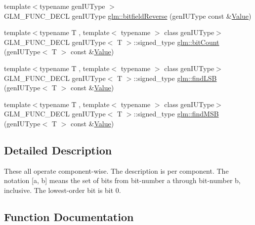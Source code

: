 \begin{DoxyCompactItemize}
\item 
{\footnotesize template$<$typename gen\+I\+U\+Type $>$ }\\G\+L\+M\+\_\+\+F\+U\+N\+C\+\_\+\+D\+E\+CL gen\+I\+U\+Type \hyperlink{group__core__func__integer_gac28880e609c6eeb0a28f1a54b1edc715}{glm\+::bitfield\+Reverse} (gen\+I\+U\+Type const \&\hyperlink{document_8h_a071cf97155ba72ac9a1fc4ad7e63d481}{Value})
\item 
{\footnotesize template$<$typename T , template$<$ typename $>$ class gen\+I\+U\+Type$>$ }\\G\+L\+M\+\_\+\+F\+U\+N\+C\+\_\+\+D\+E\+CL gen\+I\+U\+Type$<$ T $>$\+::signed\+\_\+type \hyperlink{group__core__func__integer_gaf5ecf64cbcb7f806a3c7915dd622209b}{glm\+::bit\+Count} (gen\+I\+U\+Type$<$ T $>$ const \&\hyperlink{document_8h_a071cf97155ba72ac9a1fc4ad7e63d481}{Value})
\item 
{\footnotesize template$<$typename T , template$<$ typename $>$ class gen\+I\+U\+Type$>$ }\\G\+L\+M\+\_\+\+F\+U\+N\+C\+\_\+\+D\+E\+CL gen\+I\+U\+Type$<$ T $>$\+::signed\+\_\+type \hyperlink{group__core__func__integer_ga43d5d9ec05ba4c46035c764ad5fd3135}{glm\+::find\+L\+SB} (gen\+I\+U\+Type$<$ T $>$ const \&\hyperlink{document_8h_a071cf97155ba72ac9a1fc4ad7e63d481}{Value})
\item 
{\footnotesize template$<$typename T , template$<$ typename $>$ class gen\+I\+U\+Type$>$ }\\G\+L\+M\+\_\+\+F\+U\+N\+C\+\_\+\+D\+E\+CL gen\+I\+U\+Type$<$ T $>$\+::signed\+\_\+type \hyperlink{group__core__func__integer_gaee931af2eaecf61b629b33899c9d6f29}{glm\+::find\+M\+SB} (gen\+I\+U\+Type$<$ T $>$ const \&\hyperlink{document_8h_a071cf97155ba72ac9a1fc4ad7e63d481}{Value})
\end{DoxyCompactItemize}


\subsection{Detailed Description}
These all operate component-\/wise. The description is per component. The notation \mbox{[}a, b\mbox{]} means the set of bits from bit-\/number a through bit-\/number b, inclusive. The lowest-\/order bit is bit 0. 

\subsection{Function Documentation}
